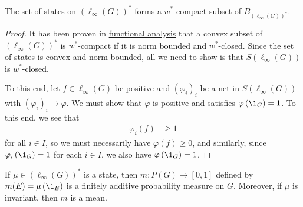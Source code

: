 \documentclass[10pt]{mypackage}
\begin{document}
\begin{corollary}
  The set of states on $\left(\ell_{\infty}\left(G\right)\right)^{\ast}$ forms a $w^{\ast}$-compact subset of $B_{\left(\ell_{\infty}\left(G\right)\right)^{\ast}}$.
\end{corollary}
\begin{proof}
  It has been proven in \href{https://blog.avinashiyer.xyz/Classes_and_Homework/College/Y4/Honors%20Thesis/topological_vector_spaces.pdf}{functional analysis} that a convex subset of $\left(\ell_{\infty}\left(G\right)\right)^{\ast}$ is $w^{\ast}$-compact if it is norm bounded and $w^{\ast}$-closed. Since the set of states is convex and norm-bounded, all we need to show is that $S\left(\ell_{\infty}\left(G\right)\right)$ is $w^{\ast}$-closed.\newline

    To this end, let $f\in \ell_{\infty}(G)$ be positive and $\left(\varphi_i\right)_i$ be a net in $S\left(\ell_{\infty}\left(G\right)\right)$ with $\left(\varphi_i\right)_i\rightarrow \varphi$. We must show that $\varphi$ is positive and satisfies $\varphi\left(\1_{G}\right) = 1$. To this end, we see that
    \begin{align*}
      \varphi_i\left(f\right) &\geq 1
    \end{align*}
    for all $i\in I$, so we must necessarily have $\varphi\left(f\right) \geq 0$, and similarly, since $\varphi_i\left(\1_{G}\right) = 1$ for each $i\in I$, we also have $\varphi\left(\1_G\right) = 1$.
\end{proof}
\begin{proposition}
  If $\mu\in \left(\ell_{\infty}\left(G\right)\right)^{\ast}$ is a state, then $m\colon P(G) \rightarrow [0,1]$ defined by $m(E) = \mu\left(\1_{E}\right)$ is a finitely additive probability measure on $G$. Moreover, if $\mu$ is invariant, then $m$ is a mean.
\end{proposition}
\end{document}
